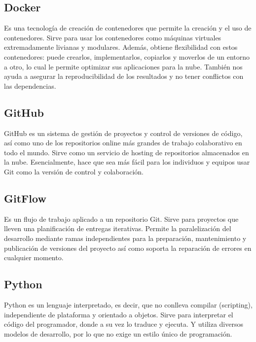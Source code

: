 \documentclass[12pt,letterpaper]{article}
\begin{document}
\subsection*{Docker}
Es una tecnología de creación de contenedores que permite la creación y el uso de contenedores.
Sirve para usar los contenedores como máquinas virtuales extremadamente livianas y modulares.
Además, obtiene flexibilidad con estos contenedores: puede crearlos, implementarlos, copiarlos y
moverlos de un entorno a otro, lo cual le permite optimizar sus aplicaciones para la nube.
\citep{redhat_docker}
También nos ayuda a asegurar la reproducibilidad de los resultados y no tener conflictos con las
dependencias.

\subsection*{GitHub}
GitHub es un sistema de gestión de proyectos y control de versiones de código, así como uno de los
repositorios online más grandes de trabajo colaborativo en todo el mundo.
\citep{hostinger_tutoriales_2019}
Sirve como un servicio de hosting de repositorios almacenados en la nube.  Esencialmente, hace que
sea más fácil para los individuos y equipos usar Git como la versión de control y colaboración.
\citep{kinsta_2020}

\subsection*{GitFlow}
Es un flujo de trabajo aplicado a un repositorio Git. Sirve para proyectos que lleven una
planificación de entregas iterativas. Permite la paralelización del desarrollo mediante ramas
independientes para la preparación, mantenimiento y publicación de versiones del proyecto así como
soporta la reparación de errores en cualquier momento.
\citep{claventy_2020}

\subsection*{Python}
Python es un lenguaje interpretado, es decir, que no conlleva compilar (scripting), independiente de
plataforma y orientado a objetos. 
\citep{desarrollo_web_2003}
Sirve para interpretar el código del programador, donde a su vez lo traduce y ejecuta. Y utiliza
diversos modelos de desarrollo, por lo que no exige un estilo único de programación.
\citep{angeles_2020}
\end{document}
